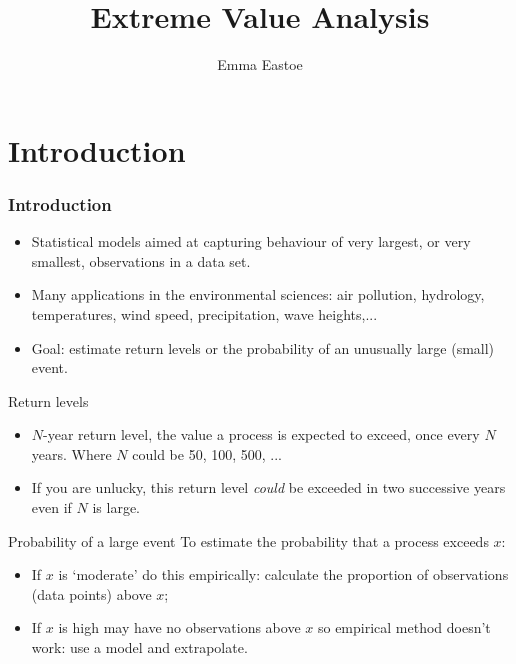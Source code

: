 \documentclass[dvipsnames]{beamer}
\author[Emma Eastoe]{Emma Eastoe}
\institute[Lancaster University]{Department of Mathematics and
  Statistics \\  Lancaster University, UK}
\title[Extremes@Lancaster]{Extreme Value Analysis}
\date
\begin{document}
\begin{frame}
\titlepage
\end{frame}


\begin{frame}
\tableofcontents
\end{frame}


\section{Introduction}
\begin{frame}
\frametitle{Introduction}

\begin{itemize}
\item
Statistical models aimed at capturing behaviour of very largest, or very smallest, observations in a data set.
\item
Many applications in the environmental sciences: air pollution, hydrology, temperatures, wind speed, precipitation, wave heights,...
\item
Goal: estimate return levels or the probability of an unusually large (small) event.
\end{itemize}

\end{frame}


\begin{frame}


\begin{block}{Return levels}
\begin{itemize}
\item
$N$-year return level, the value a process is expected to exceed, once every $N$ years. Where $N$ could be 50, 100, 500, ...
\item
If you are unlucky, this return level {\it could} be exceeded in two successive years even if $N$ is large.
\end{itemize}
\end{block}

\begin{block}{Probability of a large event}
To estimate the probability that a process exceeds $x$:
\begin{itemize}
\item
If $x$ is `moderate' do this empirically: calculate the proportion of observations (data points) above $x$;
\item
If $x$ is high may have no observations above $x$ so empirical method doesn't work: use a model and extrapolate.
\end{itemize}
\end{block}

\end{frame}
\end{document}

